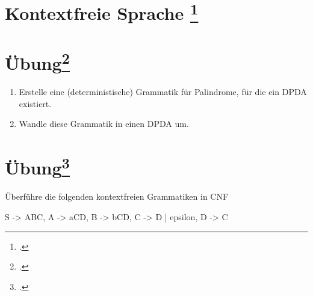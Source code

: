 \documentclass{lehramt-informatik-aufgabe}
\begin{document}
\let\m=\liMenge

\section{Kontextfreie Sprache
\footcite{theo:fs:2}}

\section{Übung\footcite[Seite 34]{theo:fs:2}}

\begin{enumerate}
\item Erstelle eine (deterministische) Grammatik für Palindrome, für die
ein DPDA existiert.


\item Wandle diese Grammatik in einen DPDA um.
\end{enumerate}

%

\section{Übung\footcite[Seite 37]{theo:fs:2}}

Überführe die folgenden kontextfreien Grammatiken in CNF

\begin{liProduktionsRegeln}
S -> ABC,
A -> aCD,
B -> bCD,
C -> D | epsilon,
D -> C
\end{liProduktionsRegeln}
\end{document}
